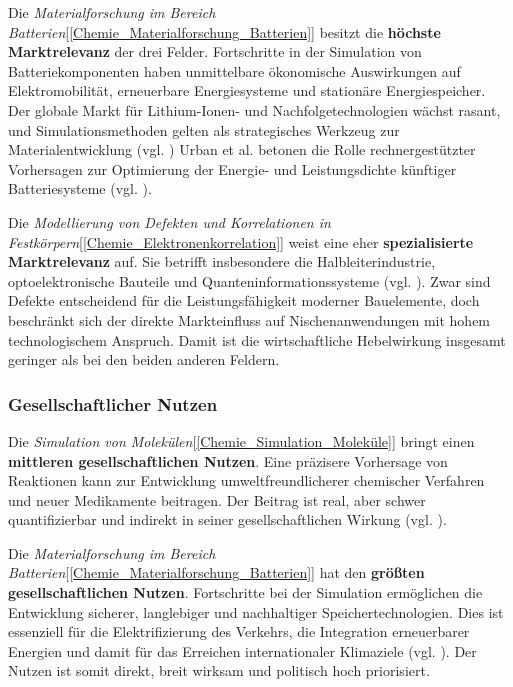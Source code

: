 Die \textit{Materialforschung im Bereich Batterien}[\ref{Chemie_Materialforschung_Batterien}] besitzt die \textbf{höchste Marktrelevanz} der drei Felder. Fortschritte in der Simulation von Batteriekomponenten haben unmittelbare ökonomische Auswirkungen auf Elektromobilität, erneuerbare Energiesysteme und stationäre Energiespeicher. Der globale Markt für Lithium-Ionen- und Nachfolgetechnologien wächst rasant, und Simulationsmethoden gelten als strategisches Werkzeug zur Materialentwicklung (vgl. \cite{demirApplicationQuantumComputing2024}) Urban et al. betonen die Rolle rechnergestützter Vorhersagen zur Optimierung der Energie- und Leistungsdichte künftiger Batteriesysteme (vgl. \cite{urban_computational_2016}).

\vspace{0.5em}

Die \textit{Modellierung von Defekten und Korrelationen in Festkörpern}[\ref{Chemie_Elektronenkorrelation}] weist eine eher \textbf{spezialisierte Marktrelevanz} auf. Sie betrifft insbesondere die Halbleiterindustrie, optoelektronische Bauteile und Quanteninformationssysteme (vgl. \cite{bassett_quantum_2019}). Zwar sind Defekte entscheidend für die Leistungsfähigkeit moderner Bauelemente, doch beschränkt sich der direkte Markteinfluss auf Nischenanwendungen mit hohem technologischem Anspruch. Damit ist die wirtschaftliche Hebelwirkung insgesamt geringer als bei den beiden anderen Feldern.

\subsubsection{Gesellschaftlicher Nutzen}

Die \textit{Simulation von Molekülen}[\ref{Chemie_Simulation_Moleküle}] bringt einen \textbf{mittleren gesellschaftlichen Nutzen}. Eine präzisere Vorhersage von Reaktionen kann zur Entwicklung umweltfreundlicherer chemischer Verfahren und neuer Medikamente beitragen. Der Beitrag ist real, aber schwer quantifizierbar und indirekt in seiner gesellschaftlichen Wirkung (vgl. \cite{mcardle_quantum_2020}).

\vspace{0.5em}

Die \textit{Materialforschung im Bereich Batterien}[\ref{Chemie_Materialforschung_Batterien}] hat den \textbf{größten gesellschaftlichen Nutzen}. Fortschritte bei der Simulation ermöglichen die Entwicklung sicherer, langlebiger und nachhaltiger Speichertechnologien. Dies ist essenziell für die Elektrifizierung des Verkehrs, die Integration erneuerbarer Energien und damit für das Erreichen internationaler Klimaziele (vgl. \cite{demirApplicationQuantumComputing2024}). Der Nutzen ist somit direkt, breit wirksam und politisch hoch priorisiert.

